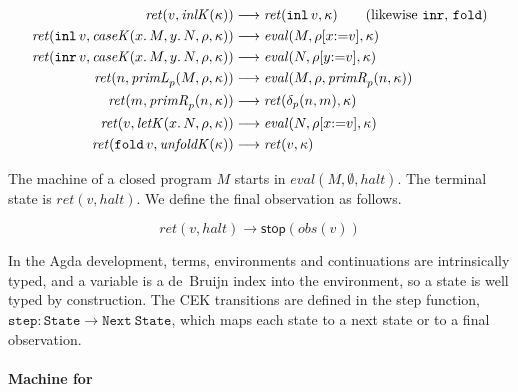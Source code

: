 \begin{align*}
  \mathit{ret}(v, \mathit{inlK}(\kappa)) &\longrightarrow \mathit{ret}(\mathtt{inl}\,v, \kappa)
    \qquad\text{(likewise $\mathtt{inr}$, $\mathtt{fold}$)} \\
  \mathit{ret}(\mathtt{inl}\,v, \mathit{caseK}(x.\,M, y.\,N, \rho, \kappa)) &\longrightarrow \mathit{eval}(M, \rho[x{:=}v], \kappa) \\
  \mathit{ret}(\mathtt{inr}\,v, \mathit{caseK}(x.\,M, y.\,N, \rho, \kappa)) &\longrightarrow \mathit{eval}(N, \rho[y{:=}v], \kappa) \\
  \mathit{ret}(n, \mathit{primL}_p(M, \rho, \kappa)) &\longrightarrow \mathit{eval}(M, \rho, \mathit{primR}_p(n, \kappa)) \\
  \mathit{ret}(m, \mathit{primR}_p(n, \kappa)) &\longrightarrow \mathit{ret}(\delta_p(n, m), \kappa) \\
  \mathit{ret}(v, \mathit{letK}(x.\,N, \rho, \kappa)) &\longrightarrow \mathit{eval}(N, \rho[x{:=}v], \kappa) \\
  \mathit{ret}(\mathtt{fold}\,v, \mathit{unfoldK}(\kappa)) &\longrightarrow \mathit{ret}(v, \kappa)
\end{align*}

The machine of a closed program $M$ starts in
$\mathit{eval}(M, \emptyset, \mathit{halt})$. The terminal state is
$\mathit{ret}(v, \mathit{halt})$. We define the final observation as follows.

\[
  \mathit{ret}(v, \mathit{halt}) \longrightarrow \mathsf{stop}(\mathit{obs}(v))
\]

In the Agda development, terms, environments and continuations are intrinsically
typed, and a variable is a de~Bruijn index into the environment, so a state is
well typed by construction. The CEK transitions are defined in the step
function, $\texttt{step} : \texttt{State}
\to \texttt{Next}\ \texttt{State}$, which maps each state to a next state or
to a final observation.

\paragraph{Machine for \instr}

